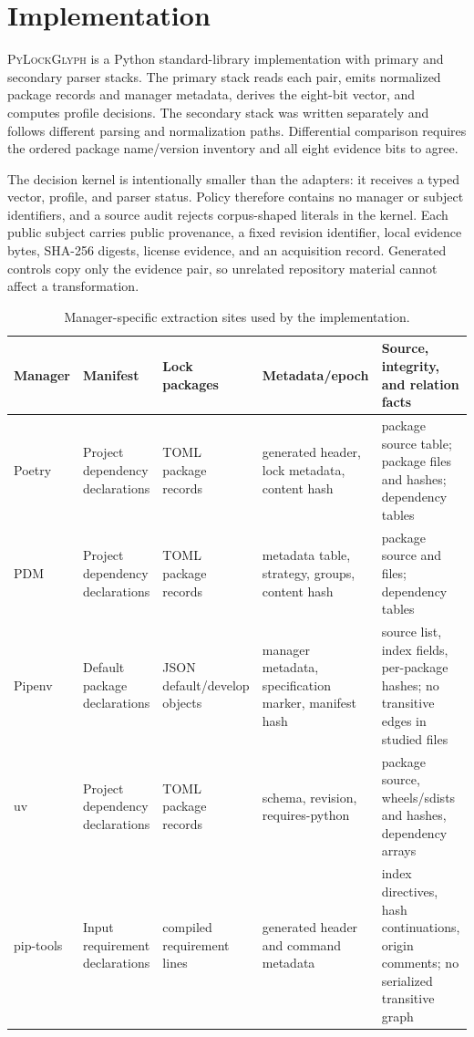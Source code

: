 \documentclass[10pt,conference]{IEEEtran}
\newcommand{\tool}{\textsc{PyLockGlyph}}
\begin{document}
\section{Implementation}
\tool{} is a Python standard-library implementation with primary and secondary parser stacks. The primary stack reads each pair, emits normalized package records and manager metadata, derives the eight-bit vector, and computes profile decisions. The secondary stack was written separately and follows different parsing and normalization paths. Differential comparison requires the ordered package name/version inventory and all eight evidence bits to agree.

The decision kernel is intentionally smaller than the adapters: it receives a typed vector, profile, and parser status. Policy therefore contains no manager or subject identifiers, and a source audit rejects corpus-shaped literals in the kernel. Each public subject carries public provenance, a fixed revision identifier, local evidence bytes, SHA-256 digests, license evidence, and an acquisition record. Generated controls copy only the evidence pair, so unrelated repository material cannot affect a transformation.

\begin{table}[t]
\caption{Manager-specific extraction sites used by the implementation.}
\centering\small
\begin{tabularx}{\textwidth}{p{}p{}p{}p{}X}
\toprule
Manager & Manifest & Lock packages & Metadata/epoch & Source, integrity, and relation facts\\
\midrule
Poetry & Project dependency declarations & TOML package records & generated header, lock metadata, content hash & package source table; package files and hashes; dependency tables\\
PDM & Project dependency declarations & TOML package records & metadata table, strategy, groups, content hash & package source and files; dependency tables\\
Pipenv & Default package declarations & JSON default/develop objects & manager metadata, specification marker, manifest hash & source list, index fields, per-package hashes; no transitive edges in studied files\\
uv & Project dependency declarations & TOML package records & schema, revision, requires-python & package source, wheels/sdists and hashes, dependency arrays\\
pip-tools & Input requirement declarations & compiled requirement lines & generated header and command metadata & index directives, hash continuations, origin comments; no serialized transitive graph\\
\bottomrule
\end{tabularx}
\label{tab:extract}
\end{table}
\end{document}
